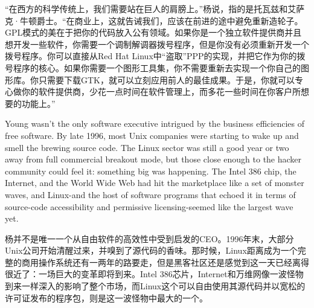 \ifdefined\chs
``在西方的科学传统上，我们需要站在巨人的肩膀上。''杨说，指的是托瓦兹和艾萨克·牛顿爵士。``在商业上，这就告诫我们，应该在前进的途中避免重新造轮子。GPL模式的美在于把你的代码放入公有领域。如果你是一个独立软件提供商并且想开发一些软件，你需要一个调制解调器拨号程序，但是你没有必须重新开发一个拨号程序。你可以直接从Red Hat Linux中``盗取''PPP的实现，并把它作为你的拨号程序的核心。如果你需要一个图形工具集，你不需要重新去实现一个你自己的图形库。你只需要下载GTK，就可以立刻应用前人的最佳成果。于是，你就可以专心做你的软件提供商，少花一点时间在软件管理上，而多花一些时间在你客户所想要的功能上。''
\fi

\ifdefined\eng
Young wasn't the only software executive intrigued by the business efficiencies of free software. By late 1996, most Unix companies were starting to wake up and smell the brewing source code. The Linux sector was still a good year or two away from full commercial breakout mode, but those close enough to the hacker community could feel it: something big was happening. The Intel 386 chip, the Internet, and the World Wide Web had hit the marketplace like a set of monster waves, and Linux-and the host of software programs that echoed it in terms of source-code accessibility and permissive licensing-seemed like the largest wave yet.
\fi

\ifdefined\chs
杨并不是唯一一个从自由软件的高效性中受到启发的CEO。1996年末，大部分Unix公司开始清醒过来，并嗅到了源代码的香味。那时候，Linux距离成为一个完整的商用操作系统还有一两年的路要走，但是黑客社区还是感觉到这一天已经离得很近了：一场巨大的变革即将到来。Intel 386芯片，Internet和万维网像一波怪物到来一样深入的影响了整个市场，而Linux这个可以自由使用其源代码并以宽松的许可证发布的程序包，则是这一波怪物中最大的一个。
\fi

